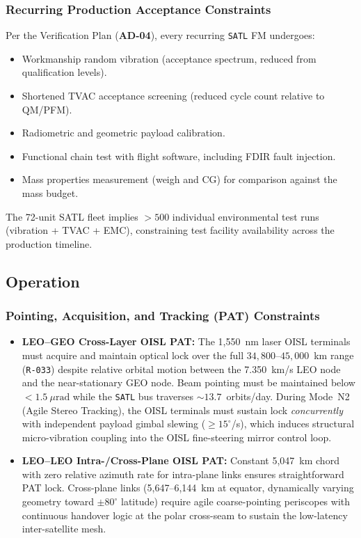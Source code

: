 \subsubsection{Recurring Production Acceptance Constraints}

Per the Verification Plan (\textbf{AD-04}), every recurring \texttt{SATL} FM undergoes:
\begin{itemize}
    \item Workmanship random vibration (acceptance spectrum, reduced from qualification levels).
    \item Shortened TVAC acceptance screening (reduced cycle count relative to QM/PFM).
    \item Radiometric and geometric payload calibration.
    \item Functional chain test with flight software, including FDIR fault injection.
    \item Mass properties measurement (weigh and CG) for comparison against the mass budget.
\end{itemize}
The 72-unit SATL fleet implies $> 500$ individual environmental test runs (vibration + TVAC + EMC), constraining test facility availability across the production timeline.

\subsection{Operation}
\label{sec:constraints_operation}

\subsubsection{Pointing, Acquisition, and Tracking (PAT) Constraints}

\begin{itemize}
    \item \textbf{LEO--GEO Cross-Layer OISL PAT:} The 1,550~nm laser OISL terminals must acquire and maintain optical lock over the full $34{,}800$--$45{,}000$~km range (\texttt{R-033}) despite relative orbital motion between the 7.350~km/s LEO node and the near-stationary GEO node. Beam pointing must be maintained below $< 1.5~\mu\mathrm{rad}$ while the \texttt{SATL} bus traverses ${\sim}13.7$~orbits/day. During Mode~N2 (Agile Stereo Tracking), the OISL terminals must sustain lock \emph{concurrently} with independent payload gimbal slewing ($\ge 15^\circ$/s), which induces structural micro-vibration coupling into the OISL fine-steering mirror control loop.
    \item \textbf{LEO--LEO Intra-/Cross-Plane OISL PAT:} Constant 5,047~km chord with zero relative azimuth rate for intra-plane links ensures straightforward PAT lock. Cross-plane links (5,647--6,144~km at equator, dynamically varying geometry toward $\pm 80^\circ$ latitude) require agile coarse-pointing periscopes with continuous handover logic at the polar cross-seam to sustain the low-latency inter-satellite mesh.
\end{itemize}

